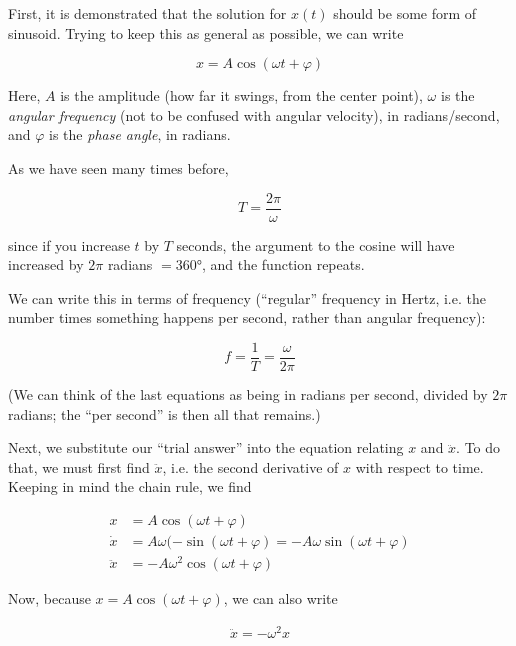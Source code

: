 \documentclass[12pt,a4paper]{report}
\begin{document}
First, it is demonstrated that the solution for $x(t)$ should be some form of sinusoid. Trying to keep this as general as possible, we can write

\begin{equation}
x = A \cos(\omega t + \varphi)
\end{equation}

Here, $A$ is the amplitude (how far it swings, from the center point), $\omega$ is the \emph{angular frequency} (not to be confused with angular velocity), in radians/second, and $\varphi$ is the \emph{phase angle}, in radians.

As we have seen many times before,

\begin{equation}
T = \frac{2 \pi}{\omega}
\end{equation}

since if you increase $t$ by $T$ seconds, the argument to the cosine will have increased by $2 \pi$ radians $= \ang{360}$, and the function repeats.

We can write this in terms of frequency (``regular'' frequency in Hertz, i.e. the number times something happens per second, rather than angular frequency):

\begin{equation}
f = \frac{1}{T} = \frac{\omega}{2 \pi}
\end{equation}

(We can think of the last equations as being in radians per second, divided by $2 \pi$ radians; the ``per second'' is then all that remains.)

Next, we substitute our ``trial answer'' into the equation relating $x$ and $\ddot{x}$. To do that, we must first find $\ddot{x}$, i.e. the second derivative of $x$ with respect to time. Keeping in mind the chain rule, we find

\begin{align}
x        &= A \cos(\omega t + \varphi)\\
\dot{x}  &= A \omega (-\sin(\omega t + \varphi) = -A \omega \sin(\omega t + \varphi)\\
\ddot{x} &= -A \omega^2 \cos(\omega t + \varphi)
\end{align}

Now, because $x = A \cos(\omega t + \varphi)$, we can also write

\begin{align}
\ddot{x} = -\omega^2 x
\end{align}
\end{document}

